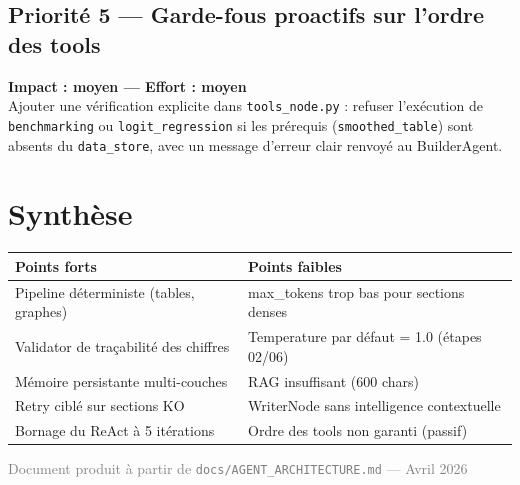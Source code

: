 \documentclass[12pt,a4paper]{article}
\begin{document}
\begin{improvebox}
\subsection*{Priorité 5 — Garde-fous proactifs sur l'ordre des tools}
\textbf{Impact : moyen — Effort : moyen}\\
Ajouter une vérification explicite dans \texttt{tools\_node.py} :
refuser l'exécution de \texttt{benchmarking} ou \texttt{logit\_regression}
si les prérequis (\texttt{smoothed\_table}) sont absents du \texttt{data\_store},
avec un message d'erreur clair renvoyé au BuilderAgent.

\end{improvebox}

\bigskip

\section*{Synthèse}

\begin{center}
\begin{tabular}{p{6cm} p{6cm}}
\toprule
\textbf{\color{agentgreen}Points forts} & \textbf{\color{agentred}Points faibles} \\
\midrule
Pipeline déterministe (tables, graphes) & max\_tokens trop bas pour sections denses \\
Validator de traçabilité des chiffres   & Temperature par défaut = 1.0 (étapes 02/06) \\
Mémoire persistante multi-couches       & RAG insuffisant (600 chars) \\
Retry ciblé sur sections KO             & WriterNode sans intelligence contextuelle \\
Bornage du ReAct à 5 itérations         & Ordre des tools non garanti (passif) \\
\bottomrule
\end{tabular}
\end{center}

\vfill
\begin{center}
  \textcolor{gray}{\small Document produit à partir de \texttt{docs/AGENT\_ARCHITECTURE.md} — Avril 2026}
\end{center}
\end{document}
